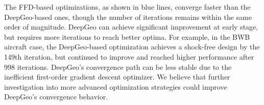 The FFD-based optimizations, as shown in blue lines, converge faster than the DeepGeo-based ones, though the number of iterations remains within the same order of magnitude. DeepGeo can achieve significant improvement at early stage, but requires more iterations to reach better optima. For example, in the BWB aircraft case, the DeepGeo-based optimization achieves a shock-free design by the 149th iteration, but continued to improve and reached higher performance after 998 iterations. DeepGeo's convergence path can be less stable due to the inefficient first-order gradient descent optimizer. We believe that further investigation into more advanced optimization strategies could improve DeepGeo's convergence behavior.